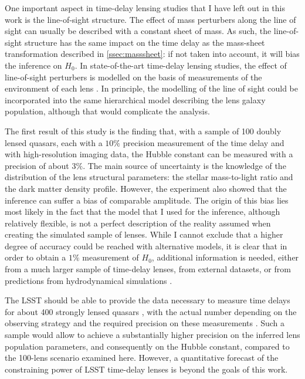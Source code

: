 \documentclass{aa}
\begin{document}
One important aspect in time-delay lensing studies that I have left out in this work is the line-of-sight structure. The effect of mass perturbers along the line of sight can usually be described with a constant sheet of mass. As such, the line-of-sight structure has the same impact on the time delay as the mass-sheet transformation described in \ref{ssec:masssheet}: if not taken into account, it will bias the inference on $H_0$.
In state-of-the-art time-delay lensing studies, the effect of line-of-sight perturbers is modelled on the basis of measurements of the environment of each lens \citep[see e.g.][ for details]{Rus++17}.
In principle, the modelling of the line of sight could be incorporated into the same hierarchical model describing the lens galaxy population, although that would complicate the analysis. 

The first result of this study is the finding that, with a sample of 100 doubly lensed quasars, each with a $10\%$ precision measurement of the time delay and with high-resolution imaging data, the Hubble constant can be measured with a precision of about $3\%$.
The main source of uncertainty is the knowledge of the distribution of the lens structural parameters: the stellar mass-to-light ratio and the dark matter density profile.
However, the experiment also showed that the inference can suffer a bias of comparable amplitude.
The origin of this bias lies most likely in the fact that the model that I used for the inference, although relatively flexible, is not a perfect description of the reality assumed when creating the simulated sample of lenses.
While I cannot exclude that a higher degree of accuracy could be reached with alternative models, it is clear that in order to obtain a $1\%$ measurement of $H_0$, additional information is needed, either from a much larger sample of time-delay lenses, from external datasets, or from predictions from hydrodynamical simulations \citep[such as with the method proposed by][]{Har20}.

The LSST should be able to provide the data necessary to measure time delays for about 400 strongly lensed quasars \citep{Lia++15}, with the actual number depending on the observing strategy and the required precision on these measurements \citep[see also section 5.2 of][]{Loc++21}.
Such a sample would allow to achieve a substantially higher precision on the inferred lens population parameters, and consequently on the Hubble constant, compared to the 100-lens scenario examined here. However, a quantitative forecast of the constraining power of LSST time-delay lenses is beyond the goals of this work.
\end{document}
